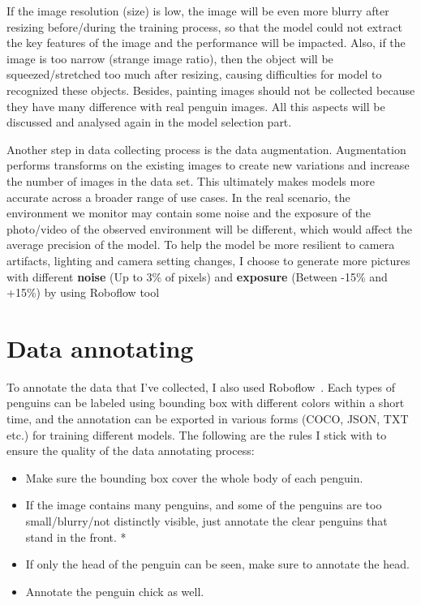 \documentclass[runningheads]{llncs}
\begin{document}
If the image resolution (size) is low, the image will be even more blurry after resizing before/during the training process, so that the model could not extract the key features of the image and the performance will be impacted. Also, if the image is too narrow (strange image ratio), then the object will be squeezed/stretched too much after resizing, causing difficulties for model to recognized these objects. Besides, painting images should not be collected because they have many difference with real penguin images. All this aspects will be discussed and analysed again in the model selection part.

Another step in data collecting process is the data augmentation. Augmentation performs transforms on the existing images to create new variations and increase the number of images in the data set. This ultimately makes models more accurate across a broader range of use cases. 
In the real scenario, the environment we monitor may contain some noise and the exposure of the photo/video of the observed environment will be different, which would affect the average precision of the model. To help the model be more resilient to camera artifacts, lighting and camera setting changes, I choose to generate more pictures with different \textbf{noise} (Up to 3\% of pixels) and \textbf{exposure} (Between -15\% and +15\%) by using Roboflow tool~\cite{ref_roboflow}


\section{Data annotating}
To annotate the data that I've collected, I also used Roboflow~\cite{ref_roboflow}. Each types of penguins can be labeled using bounding box with different colors within a short time, and the annotation can be exported in various forms (COCO, JSON, TXT etc.) for training different models. The following are the rules I stick with to ensure the quality of the data annotating process:

\begin{itemize}
  \item Make sure the bounding box cover the whole body of each penguin.
  \item If the image contains many penguins, and some of the penguins are too small/blurry/not distinctly visible, just annotate the clear penguins that stand in the front. *
  \item If only the head of the penguin can be seen, make sure to annotate the head.
  \item Annotate the penguin chick as well.
\end{itemize}
\end{document}
